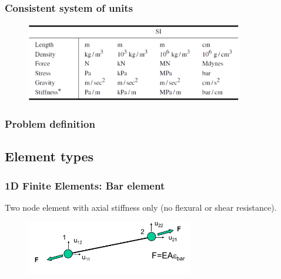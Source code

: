\documentclass[notes]{beamer}
\begin{document}
\begin{frame}
\frametitle{Consistent system of units}
\begin{figure}[ht]
	\centering
	\includegraphics[width=0.85\textwidth]{figs/units.png}
\end{figure}
\end{frame}

\begin{frame}
\frametitle{Problem definition}
\end{frame}

\subsection{Element types}
\begin{frame}
\frametitle{1D Finite Elements: Bar element}
Two node element with axial stiffness only (no flexural or shear
resistance).
\begin{figure}[ht]
	\centering
	\includegraphics[width=0.65\textwidth]{figs/bar-element.png}
\end{figure}
\end{frame}
\end{document}
